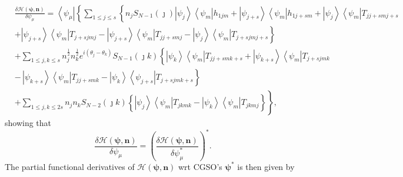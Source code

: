 \documentclass[aps,preprint]{revtex4}%
\begin{document}
\begin{align}
&  \frac{\delta\mathcal{H}\left(  \mathbf{\psi,n}\right)  }{\delta\psi_{\mu}%
}=\left\langle \psi_{\mu}\right\vert \left\{  \sum_{1\leq j\leq s}\left\{
n_{j}S_{N-1}\left(  \jmath\right)  \left\vert \psi_{j}\right\rangle
\left\langle \psi_{m}\right\vert h_{1jm}+\left\vert \psi_{j+s}\right\rangle
\left\langle \psi_{m}\right\vert h_{1j+sm}+\left\vert \psi_{j}\right\rangle
\left\langle \psi_{m}\right\vert T_{jj+smj+s}\right.  \right.  \nonumber\\
&  \left.  +\left\vert \psi_{j+s}\right\rangle \left\langle \psi
_{m}\right\vert T_{j+sjmj}-\left\vert \psi_{j+s}\right\rangle \left\langle
\psi_{m}\right\vert T_{jj+smj}-\left\vert \psi_{j}\right\rangle \left\langle
\psi_{m}\right\vert T_{j+sjmj+s}\right\}  \nonumber\\
&  +\sum_{1\leq j,k\leq s}n_{j}^{\frac{1}{2}}n_{k}^{\frac{1}{2}}e^{i\left(
\theta_{j}-\theta_{k}\right)  }S_{N-1}\left(  \jmath k\right)  \left\{
\left\vert \psi_{k}\right\rangle \left\langle \psi_{m}\right\vert
T_{jj+smk+s}+\left\vert \psi_{k+s}\right\rangle \left\langle \psi
_{m}\right\vert T_{j+sjmk}\right.  \nonumber\\
&  \left.  -\,\left\vert \psi_{k+s}\right\rangle \left\langle \psi
_{m}\right\vert T_{jj+smk}-\left\vert \psi_{k}\right\rangle \left\langle
\psi_{j+s}\right\vert T_{j+sjmk+s}\right\}  \nonumber\\
&  +\sum_{1\leq j,k\leq2s}n_{j}n_{k}S_{N-2}\left(  \jmath k\right)  \left.
\overset{}{\left\{  \left\vert \psi_{j}\right\rangle \left\langle \psi
_{m}\right\vert T_{jkmk}-\left\vert \psi_{k}\right\rangle \left\langle
\psi_{m}\right\vert T_{jkmj}\right\}  }\right\}  ,
\end{align}
showing that
\begin{equation}
\frac{\delta\mathcal{H}\left(  \mathbf{\psi,n}\right)  }{\delta\psi_{\mu}%
}=\left(  \frac{\delta\mathcal{H}\left(  \mathbf{\psi,n}\right)  }{\delta
\psi_{\mu}^{\ast}}\right)  ^{\ast}.
\end{equation}
The partial functional derivatives of $\mathcal{H}\left(  \mathbf{\psi
,n}\right)  $ wrt CGSO's $\mathbf{\psi}^{\ast}$ is then given by
\end{document}
